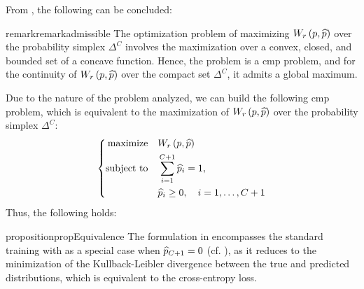 From , the following can be concluded:
\begin{restatable}{remark}{remarkadmissible}
    \label{remark:admissible}
    The optimization problem of maximizing \(\W{r}\) over the probability simplex \(\Delta^{C}\) involves the maximization over a convex, closed, and bounded set of a concave function. Hence, the problem is a \gls*{cmp} problem, and for the continuity of \(\W{r}\) over the compact set \(\Delta^{C}\), it admits a global maximum.
\end{restatable}
Due to the nature of the problem analyzed, we can build the following \gls*{cmp} problem, which is equivalent to the maximization of \(\W{r}\) over the probability simplex \(\Delta^{C}\):
\begin{align}
    \label{eq:cmp_problem}
    \left\{
    \begin{aligned}
        \text{maximize}\quad   & \W{r}                              \\
        \text{subject to}\quad & \sum_{i=1}^{C+1} \phat_i = 1,      \\
                               & \phat_i \ge 0, \quad i=1,\dots,C+1
    \end{aligned}
    \right.
\end{align}
Thus, the following holds:
\begin{restatable}{proposition}{propEquivalence}
    \label{prop:equivalence}
    The formulation in  encompasses the standard training with  as a special case when \(\widehat{p}_{C+1}=0\) (cf. \cite{liu2019deep}), as it reduces to the minimization of the Kullback-Leibler divergence between the true and predicted distributions, which is equivalent to the cross-entropy loss.
\end{restatable}
